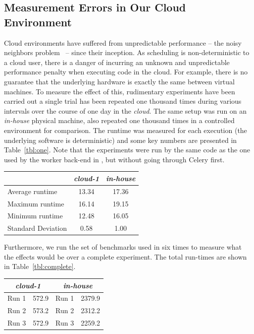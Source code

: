 \documentclass[a4paper]{IEEEtran}
\begin{document}
\subsection{Measurement Errors in Our Cloud Environment}
Cloud environments have suffered from unpredictable performance -- the noisy
neighbors problem~\cite{williamson} -- since their inception. As scheduling is
non-deterministic to a cloud user, there is a danger of incurring an unknown and
unpredictable performance penalty when executing code in the cloud. For example,
there is no guarantee that the underlying hardware is exactly the same between
virtual machines. To measure the effect of this, rudimentary experiments have
been carried out a single trial has been repeated one thousand times during
various intervals over the course of one day in the \emph{cloud}. The same setup
was run on an \emph{in-house} physical machine, also repeated one thousand times
in a controlled environment for comparison. The runtime was measured for each
execution (the underlying software is deterministic) and some key numbers are
presented in Table~\ref{tbl:one}. Note that the experiments were run by the same
code as the one used by the worker back-end in \testbench{}, but without going
through Celery first.

\begin{Figure}
  \centering
  \begin{tabular}{|l|c|c|}
    \hline
    & \emph{cloud-1} & \emph{in-house} \\
  \hline
  Average runtime &  13.34 & 17.36\\
  \hline
  Maximum runtime & 16.14 & 19.15 \\
  \hline
  Minimum runtime & 12.48 & 16.05\\
  \hline      
  Standard Deviation & 0.58 & 1.00 \\
  \hline
\end{tabular}
\label{tbl:one}
\end{Figure}

Furthermore, we run the set of benchmarks used in \cite{uppsat} six times to measure what the effects would be over a complete experiment. The total run-times are shown in Table~\ref{tbl:complete}.

\begin{Figure}
  \centering
\begin{tabular}{|l|c|l|c|}
  \hline
  \multicolumn{2}{|c|}{\emph{cloud-1}} & \multicolumn{2}{c|}{\emph{in-house}} \\
  \hline
  Run 1 &  572.9 & Run 1 & 2379.9 \\
  \hline
  Run 2 & 573.2 & Run 2 & 2312.2 \\
  \hline
  Run 3 & 572.9 & Run 3 & 2259.2 \\
  \hline      
\end{tabular}
\label{tbl:complete}
\end{Figure}
\end{document}
